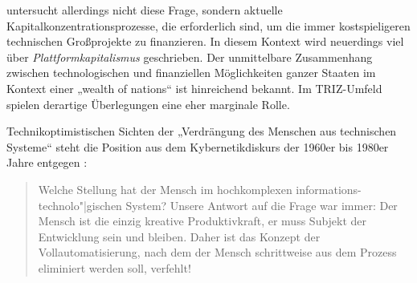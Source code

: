 \documentclass[12pt,a4paper]{article}
\begin{document}
\cite{Goldberg2016} untersucht allerdings nicht diese Frage, sondern aktuelle
Kapitalkonzentrationsprozesse, die erforderlich sind, um die immer
kostspieligeren technischen Großprojekte zu finanzieren.  In diesem Kontext
wird neuerdings viel über \emph{Plattformkapitalismus} geschrieben.  Der
unmittelbare Zusammenhang zwischen technologischen und finanziellen
Möglichkeiten ganzer Staaten im Kontext einer „wealth of nations“ ist
hinreichend bekannt. Im TRIZ-Umfeld spielen derartige Überlegungen eine eher
marginale Rolle.

Technikoptimistischen Sichten der „Verdrängung des Menschen aus technischen
Systeme“ steht die Position aus dem Kybernetikdiskurs der 1960er bis 1980er
Jahre entgegen \cite[S. 10]{KFK2000}:
\begin{quote}
  Welche Stellung hat der Mensch im hochkomplexen
  informations-technolo"|gischen System? Unsere Antwort auf die Frage war
  immer: Der Mensch ist die einzig kreative Produktivkraft, er muss Subjekt
  der Entwicklung sein und bleiben.  Daher ist das Konzept der
  Vollautomatisierung, nach dem der Mensch schrittweise aus dem Prozess
  eliminiert werden soll, verfehlt!
\end{quote}
\end{document}
